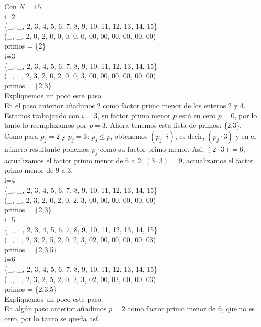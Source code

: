 \begin{ejemplo} Con $N = 15$. \\
i=2 \\ 
\{\_, \_, 2, 3, 4, 5, 6, 7, 8, 9, 10, 11, 12, 13, 14, 15\} \\ 
(\_, \_, 2, 0, 2, 0, 0, 0, 0, 0, 00, 00, 00, 00, 00, 00) \\ 
primos = \{2\} \\ 
i=3 \\ 
\{\_, \_, 2, 3, 4, 5, 6, 7, 8, 9, 10, 11, 12, 13, 14, 15\} \\ 
(\_, \_, 2, 3, 2, 0, 2, 0, 0, 3, 00, 00, 00, 00, 00, 00) \\ 
primos = \{2,3\} \\ 
Expliquemos un poco este paso. \\
En el paso anterior añadimos 2 como factor primo menor de los enteros 2 y 4. \\
Estamos trabajando con $i = 3$, su factor primo menor $p$ está en cero $p = 0$, por lo tanto lo reemplazamos por $p =3$. Ahora tenemos esta lista de primos: \{2,3\}. \\
Como para $p_j = 2$ y $p_j = 3$: $p_j \leq p$, obtenemos $(p_j \cdot i)$, es decir, $(p_j \cdot 3)$ y en el número resultante ponemos $p_j$ como su factor primo menor. Así, $(2 \cdot 3) = 6$, actualizamos el factor primo menor de 6 a 2; $(3 \cdot 3) = 9$, actualizamos el factor primo menor de 9 a 3. \\
i=4 \\ 
\{\_, \_, 2, 3, 4, 5, 6, 7, 8, 9, 10, 11, 12, 13, 14, 15\} \\ 
(\_, \_, 2, 3, 2, 0, 2, 0, 2, 3, 00, 00, 00, 00, 00, 00) \\ 
primos = \{2,3\} \\ 
i=5 \\ 
\{\_, \_, 2, 3, 4, 5, 6, 7, 8, 9, 10, 11, 12, 13, 14, 15\} \\ 
(\_, \_, 2, 3, 2, 5, 2, 0, 2, 3,  02, 00, 00, 00, 00, 03) \\ 
primos = \{2,3,5\} \\ 
i=6 \\ 
\{\_, \_, 2, 3, 4, 5, 6, 7, 8, 9, 10, 11, 12, 13, 14, 15\} \\ 
(\_, \_, 2, 3, 2, 5, 2, 0, 2, 3,  02, 00, 02, 00, 00, 03) \\ 
primos = \{2,3,5\} \\ 
Expliquemos un poco este paso. \\
En algún paso anterior añadimos $p = 2$ como factor primo menor de 6, que no es cero, por lo tanto se queda así. \\

\end{ejemplo}
